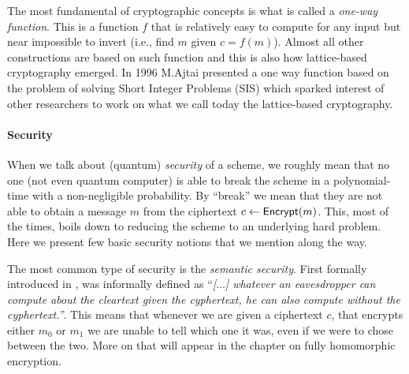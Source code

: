 The most fundamental of cryptographic concepts is what is called a \textit{one-way function}. This is a function $f$ that is relatively easy to compute for any input but near impossible to invert (i.e., find $m$ given $c = f(m)$). Almost all other constructions are based on such function and this is also how lattice-based cryptography emerged. In 1996 M.Ajtai presented \cite{ajtai} a one way function based on the problem of solving Short Integer Problems (SIS) which sparked interest of other researchers to work on what we call today the lattice-based cryptography.

\paragraph{Security}
When we talk about (quantum) \textit{security} of a scheme, we roughly mean that no one (not even quantum computer) is able to break the scheme in a polynomial-time with a non-negligible probability. By ``break'' we mean that they are not able to obtain a message $m$ from the ciphertext $c \leftarrow \textsf{Encrypt}(m)$. This, most of the times, boils down to reducing the scheme to an underlying hard problem. Here we present few basic security notions that we mention along the way.

The most common type of security is the \textit{semantic security}. First formally introduced in \cite{prob-cryp}, was informally defined as ``\textit{[$\ldots$] whatever an eavesdropper can compute about the cleartext given the cyphertext, he can also compute without the cyphertext.''}. This means that whenever we are given a ciphertext $c$, that encrypts either $m_0$ or $m_1$ we are unable to tell which one it was, even if we were to chose between the two. More on that will appear in the chapter on fully homomorphic encryption.

\iffalse
\begin{figure}[hb]
	\centering
	\texttt{[image: pythia.jpg]}
	\caption{Priestess of Delphi (1891) by John Collier.}
\end{figure}
\fi
